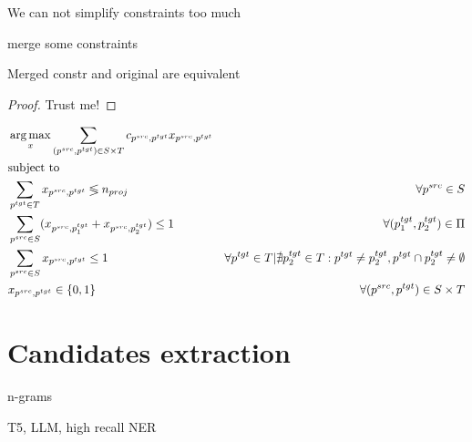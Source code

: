 \begin{corollary}
    We can not simplify constraints too much
\end{corollary}

merge some constraints
\begin{theorem}
    Merged constr and original are equivalent
\end{theorem}
\begin{proof}
    Trust me!
\end{proof}

\begin{equation}
    \begin{aligned}
         & \operatorname*{arg\,max}\limits_x \sum\limits_{(p^{src}, p^{tgt}) \in S \times T} c_{p^{src}, p^{tgt}} x_{p^{src}, p^{tgt}}                                                                                                                   \\
         & \text{subject to} \notag                                                                                                                                                                                                     \\
         & \sum\limits_{p^{tgt} \in T} x_{p^{src}, p^{tgt}} \lessgtr n_{proj}                                         & \forall p^{src} \in S                                                                                           \\
         & \sum\limits_{p^{src} \in S} (x_{p^{src}, p_1^{tgt}} + x_{p^{src}, p_2^{tgt}}) \leq 1                       & \forall (p_1^{tgt}, p_2^{tgt}) \in \Pi                                                                          \\
         & \sum\limits_{p^{src} \in S} x_{p^{src}, p^{tgt}} \leq 1                                                    & \forall p^{tgt} \in T | \nexists p_2^{tgt} \in T: p^{tgt} \neq p_2^{tgt}, p^{tgt} \cap p_2^{tgt} \neq \emptyset \\
         & x_{p^{src}, p^{tgt}} \in \{ 0, 1 \}                                                                        & \forall (p^{src}, p^{tgt}) \in S \times T
    \end{aligned}
\end{equation}

\section{Candidates extraction}
n-grams

T5, LLM, high recall NER

